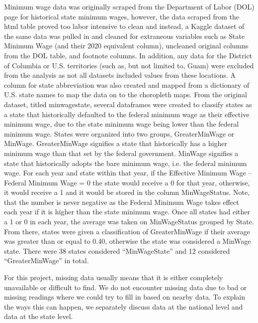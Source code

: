 \documentclass[reqno,11pt]{amsart}
\begin{document}
Minimum wage data was originally scraped from the Department of Labor (DOL) page for historical 
state minimum wages, however, the data scraped from the html table proved too labor intensive 
to clean and instead, a Kaggle dataset of the same data was pulled in and cleaned for extraneous 
variables such as State Minimum Wage (and their 2020 equivalent column), uncleaned original 
columns from the DOL table, and footnote columns. In addition, any data for the District of 
Columbia or U.S. territories (such as, but not limited to, Guam) were excluded from the analysis 
as not all datasets included values from these locations. A column for state abbreviation was also 
created and mapped from a dictionary of U.S. state names to map the data on to the choropleth maps. 
From the original dataset, titled minwagestate, several dataframes were created to classify states 
as a state that historically defaulted to the federal minimum wage as their effective minimum wage, 
due to the state minimum wage being lower than the federal minimum wage. States were organized into 
two groups, GreaterMinWage or MinWage. GreaterMinWage signifies a state that historically has a 
higher minimum wage than that set by the federal government. MinWage signifies a state that historically 
adopts the bare minimum wage, i.e. the federal minimum wage. For each year and state within that year, 
if the Effective Minimum Wage – Federal Minimum Wage = 0 the state would receive a 0 for that year, 
otherwise, it would receive a 1 and it would be stored in the column MinWageStatus. Note, that the 
number is never negative as the Federal Minimum Wage takes effect each year if it is higher than the 
state minimum wage. Once all states had either a 1 or 0 in each year, the average was taken on
 MinWageStatus grouped by State. From there, states were given a classification of GreaterMinWage if 
 their average was greater than or equal to 0.40, otherwise the state was considered a MinWage state. 
 There were 38 states considered ``MinWageState'' and 12 considered ``GreaterMinWage'' in total.



For this project, missing data usually means that it is either completely unavailable
or difficult to find. We do not encounter missing data due to bad or missing readings
where we could try to fill in based on nearby data. To explain the ways this can happen, 
we separately discuss data at the national level and data at the state level.
\end{document}
